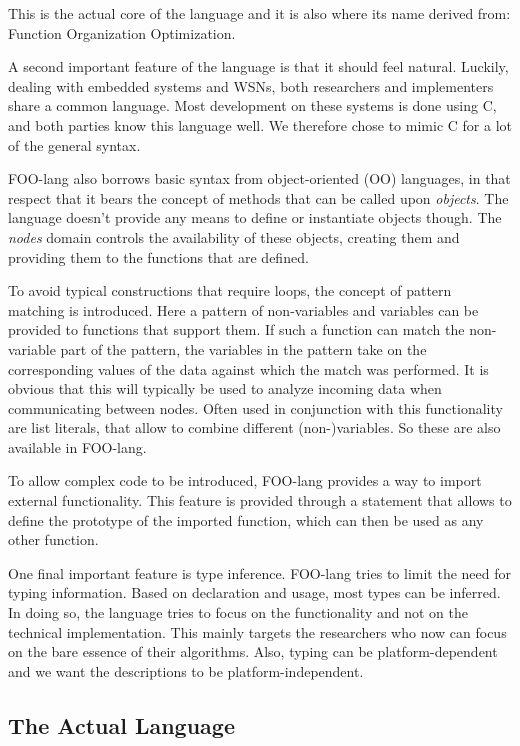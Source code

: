 \documentclass[conference]{IEEEtran}
\begin{document}
This is the actual core of the language and it is also where its name derived
from: Function Organization Optimization.

A second important feature of the language is that it should feel natural.
Luckily, dealing with embedded systems and WSNs, both researchers and
implementers share a common language. Most development on these systems is done
using C, and both parties know this language well. We therefore chose to mimic
C for a lot of the general syntax.

FOO-lang also borrows basic syntax from object-oriented (OO) languages, in that
respect that it bears the concept of methods that can be called upon
\emph{objects}. The language doesn't provide any means to define or instantiate
objects though. The \emph{nodes} domain controls the availability of these
objects, creating them and providing them to the functions that are defined.

To avoid typical constructions that require loops, the concept of pattern
matching is introduced. Here a pattern of non-variables and variables can be
provided to functions that support them. If such a function can match the
non-variable part of the pattern, the variables in the pattern take on the
corresponding values of the data against which the match was performed. It is
obvious that this will typically be used to analyze incoming data when
communicating between nodes. Often used in conjunction with this functionality
are list literals, that allow to combine different (non-)variables. So these
are also available in FOO-lang.

To allow complex code to be introduced, FOO-lang provides a way to import
external functionality. This feature is provided through a statement that
allows to define the prototype of the imported function, which can then be used
as any other function.

One final important feature is type inference. FOO-lang tries to limit the need
for typing information. Based on declaration and usage, most types can be
inferred. In doing so, the language tries to focus on the functionality and not
on the technical implementation. This mainly targets the researchers who now
can focus on the bare essence of their algorithms. Also, typing can be
platform-dependent and we want the descriptions to be platform-independent.

\subsection{The Actual Language}
\label{subsection:language}
\end{document}

